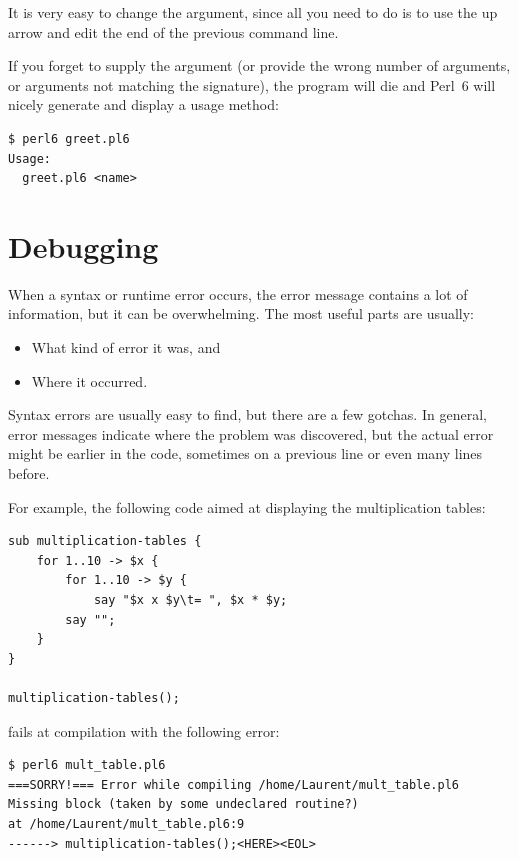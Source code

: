 It is very easy to change the argument, since all you need 
to do is to use the up arrow and edit the end of the 
previous command line.

If you forget to supply the argument (or provide the wrong 
number of arguments, or arguments not matching the signature), 
the program will die and Perl~6 will nicely generate and 
display a usage method:

\begin{verbatim}
$ perl6 greet.pl6
Usage:
  greet.pl6 <name>
\end{verbatim}


\section{Debugging}
\label{whitespace}

When a syntax or runtime error occurs, the error message contains
a lot of information, but it can be overwhelming.  The most
useful parts are usually:

\begin{itemize}

\item What kind of error it was, and

\item Where it occurred.

\end{itemize}

Syntax errors are usually easy to find, but there are a few
gotchas. In general, error messages indicate where the problem was discovered, but the actual error might be earlier in 
the code, sometimes on a previous line or even many lines 
before.

For example, the following code aimed at displaying the 
multiplication tables:

\begin{verbatim}
sub multiplication-tables {
    for 1..10 -> $x {
	    for 1..10 -> $y {
            say "$x x $y\t= ", $x * $y;
        say "";
	}
}

multiplication-tables();
\end{verbatim}

fails at compilation with the following error:

\begin{verbatim}
$ perl6 mult_table.pl6
===SORRY!=== Error while compiling /home/Laurent/mult_table.pl6
Missing block (taken by some undeclared routine?)
at /home/Laurent/mult_table.pl6:9
------> multiplication-tables();<HERE><EOL>
\end{verbatim}


